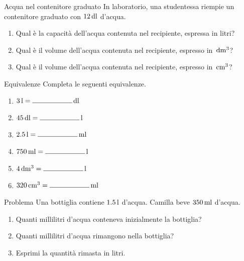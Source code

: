 \begin{esercizio}{Acqua nel contenitore graduato}
In laboratorio, una studentessa riempie un contenitore graduato con $12\,\mathrm{dl}$ d'acqua.

\begin{enumerate}[label=\alph*)]
  \item Qual è la capacità dell'acqua contenuta nel recipiente, espressa in litri?

  \spazioRisposta[1.5cm]

  \item Qual è il volume dell'acqua contenuta nel recipiente, espresso in $\,\mathrm{dm^3}$?

  \spazioRisposta[1.5cm]

  \item Qual è il volume dell'acqua contenuta nel recipiente, espresso in $\,\mathrm{cm^3}$?

  \spazioRisposta[1.8cm]
\end{enumerate}
\end{esercizio}

\begin{esercizio}{Equivalenze}
Completa le seguenti equivalenze.

\begin{enumerate}[label=\alph*)]
  \item $3\unita{l} = \rule{2cm}{0.4pt}\unita{dl}$
  \item $45\unita{dl} = \rule{2cm}{0.4pt}\unita{l}$
  \item $2.5\unita{l} = \rule{2cm}{0.4pt}\unita{ml}$
  \item $750\unita{ml} = \rule{2cm}{0.4pt}\unita{l}$
  \item $4\unita{dm^3} = \rule{2cm}{0.4pt}\unita{l}$
  \item $320\unita{cm^3} = \rule{2cm}{0.4pt}\unita{ml}$
\end{enumerate}
\end{esercizio}

\begin{esercizio}{Problema}
Una bottiglia contiene $1.5\,\mathrm{l}$ d'acqua. Camilla beve $350\,\mathrm{ml}$ d'acqua.

\begin{enumerate}[label=\alph*)]
  \item Quanti millilitri d'acqua conteneva inizialmente la bottiglia?

  \spazioRisposta[1.3cm]

  \item Quanti millilitri d'acqua rimangono nella bottiglia?

  \spazioRisposta[1.3cm]

  \item Esprimi la quantità rimasta in litri.

  \spazioRisposta[1.5cm]
\end{enumerate}
\end{esercizio}

